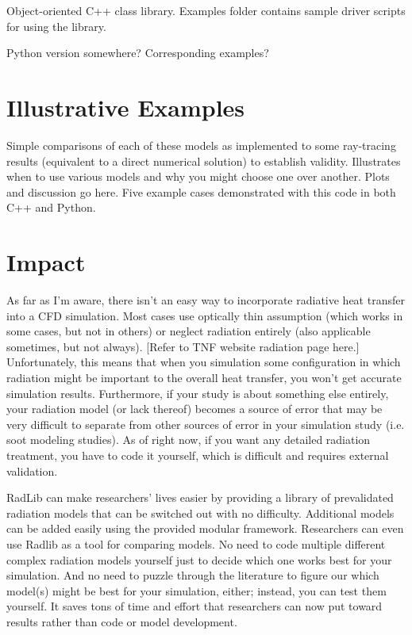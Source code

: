 \documentclass[preprint,12pt, a4paper]{elsarticle}
\begin{document}
Object-oriented C++ class library. Examples folder contains sample driver scripts for using the library. 

Python version somewhere? Corresponding examples?

\section{Illustrative Examples}
\label{s:Examples}

Simple comparisons of each of these models as implemented to some ray-tracing results (equivalent to a direct numerical solution) to establish validity. Illustrates when to use various models and why you might choose one over another. Plots and discussion go here. Five example cases demonstrated with this code in both C++ and Python.

\section{Impact}
\label{s:impact}

As far as I'm aware, there isn't an easy way to incorporate radiative heat transfer into a CFD simulation. Most cases use optically thin assumption (which works in some cases, but not in others) or neglect radiation entirely (also applicable sometimes, but not always). [Refer to TNF website radiation page here.] Unfortunately, this means that when you simulation some configuration in which radiation might be important to the overall heat transfer, you won't get accurate simulation results. Furthermore, if your study is about something else entirely, your radiation model (or lack thereof) becomes a source of error that may be very difficult to separate from other sources of error in your simulation study (i.e. soot modeling studies). As of right now, if you want any detailed radiation treatment, you have to code it yourself, which is difficult and requires external validation. 

RadLib can make researchers' lives easier by providing a library of prevalidated radiation models that can be switched out with no difficulty. Additional models can be added easily using the provided modular framework. Researchers can even use Radlib as a tool for comparing models. No need to code multiple different complex radiation models yourself just to decide which one works best for your simulation. And no need to puzzle through the literature to figure our which model(s) might be best for your simulation, either; instead, you can test them yourself. It saves tons of time and effort that researchers can now put toward results rather than code or model development. 
\end{document}
